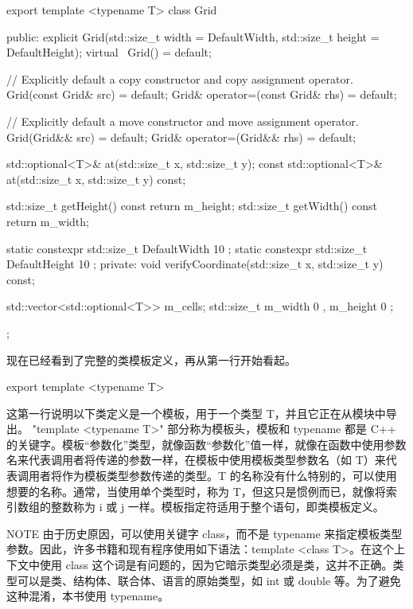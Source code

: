 \begin{cpp}
export template <typename T>
class Grid
{
    public:
        explicit Grid(std::size_t width = DefaultWidth,
            std::size_t height = DefaultHeight);
        virtual ~Grid() = default;

        // Explicitly default a copy constructor and copy assignment operator.
        Grid(const Grid& src) = default;
        Grid& operator=(const Grid& rhs) = default;

        // Explicitly default a move constructor and move assignment operator.
        Grid(Grid&& src) = default;
        Grid& operator=(Grid&& rhs) = default;

        std::optional<T>& at(std::size_t x, std::size_t y);
        const std::optional<T>& at(std::size_t x, std::size_t y) const;

        std::size_t getHeight() const { return m_height; }
        std::size_t getWidth() const { return m_width; }

        static constexpr std::size_t DefaultWidth { 10 };
        static constexpr std::size_t DefaultHeight { 10 };
    private:
        void verifyCoordinate(std::size_t x, std::size_t y) const;

        std::vector<std::optional<T>> m_cells;
        std::size_t m_width { 0 }, m_height { 0 };
};
\end{cpp}

现在已经看到了完整的类模板定义，再从第一行开始看起。

\begin{cpp}
export template <typename T>
\end{cpp}

这第一行说明以下类定义是一个模板，用于一个类型 T，并且它正在从模块中导出。 "template <typename T>" 部分称为模板头，模板和 typename 都是 C++ 的关键字。模板“参数化”类型，就像函数“参数化”值一样，就像在函数中使用参数名来代表调用者将传递的参数一样，在模板中使用模板类型参数名（如 T）来代表调用者将作为模板类型参数传递的类型。T 的名称没有什么特别的，可以使用想要的名称。通常，当使用单个类型时，称为 T，但这只是惯例而已，就像将索引数组的整数称为 i 或 j 一样。模板指定符适用于整个语句，即类模板定义。

\begin{myNotic}{NOTE}
由于历史原因，可以使用关键字 class，而不是 typename 来指定模板类型参数。因此，许多书籍和现有程序使用如下语法：template <class T>。在这个上下文中使用 class 这个词是有问题的，因为它暗示类型必须是类，这并不正确。类型可以是类、结构体、联合体、语言的原始类型，如 int 或 double 等。为了避免这种混淆，本书使用 typename。
\end{myNotic}

